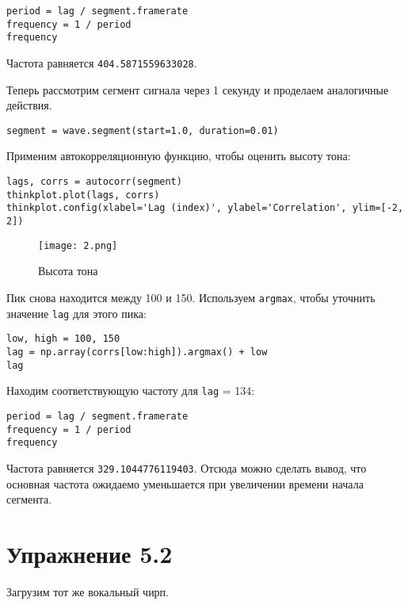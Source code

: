 \documentclass[a4paper,12pt]{report}
\begin{document}
\begin{lstlisting}[caption=Нахождение частоты]
period = lag / segment.framerate
frequency = 1 / period
frequency
\end{lstlisting}

Частота равняется \texttt{404.5871559633028}.

Теперь рассмотрим сегмент сигнала через 1 секунду и проделаем аналогичные действия.

\begin{lstlisting}[caption=Второй сегмент]
segment = wave.segment(start=1.0, duration=0.01)
\end{lstlisting}

Применим автокорреляционную функцию, чтобы оценить высоту тона:

\begin{lstlisting}[caption=Оценка высоты тона]
lags, corrs = autocorr(segment)
thinkplot.plot(lags, corrs)
thinkplot.config(xlabel='Lag (index)', ylabel='Correlation', ylim=[-2, 2])
\end{lstlisting}

\begin{figure}[H]
        \centering
        \texttt{[image: 2.png]}
        \caption{Высота тона}
        \label{fig:lab5_fig1_2}
\end{figure}

Пик снова находится между 100 и 150. Используем \texttt{argmax}, чтобы уточнить значение \texttt{lag} для этого пика:

\begin{lstlisting}[caption=Нахождение \texttt{lag}]
low, high = 100, 150
lag = np.array(corrs[low:high]).argmax() + low
lag
\end{lstlisting}

Находим соответствующую частоту для \texttt{lag} = 134:

\begin{lstlisting}[caption=Нахождение частоты]
period = lag / segment.framerate
frequency = 1 / period
frequency
\end{lstlisting}

Частота равняется \texttt{329.1044776119403}. Отсюда можно сделать вывод, что основная частота ожидаемо уменьшается при увеличении времени начала сегмента.

\chapter{Упражнение 5.2}

Загрузим тот же вокальный чирп.
\end{document}
